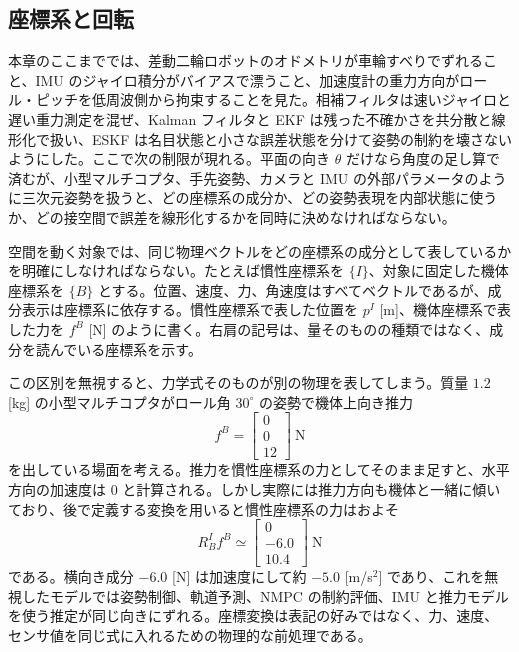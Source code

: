 \subsection{座標系と回転}

本章のここまででは、差動二輪ロボットのオドメトリが車輪すべりでずれること、IMU のジャイロ積分がバイアスで漂うこと、加速度計の重力方向がロール・ピッチを低周波側から拘束することを見た。相補フィルタは速いジャイロと遅い重力測定を混ぜ、Kalman フィルタと EKF は残った不確かさを共分散と線形化で扱い、ESKF は名目状態と小さな誤差状態を分けて姿勢の制約を壊さないようにした。ここで次の制限が現れる。平面の向き $\theta$ だけなら角度の足し算で済むが、小型マルチコプタ、手先姿勢、カメラと IMU の外部パラメータのように三次元姿勢を扱うと、どの座標系の成分か、どの姿勢表現を内部状態に使うか、どの接空間で誤差を線形化するかを同時に決めなければならない。

空間を動く対象では、同じ物理ベクトルをどの座標系の成分として表しているかを明確にしなければならない。たとえば慣性座標系を $\{I\}$、対象に固定した機体座標系を $\{B\}$ とする。位置、速度、力、角速度はすべてベクトルであるが、成分表示は座標系に依存する。慣性座標系で表した位置を $p^I$ [m]、機体座標系で表した力を $f^B$ [N] のように書く。右肩の記号は、量そのものの種類ではなく、成分を読んでいる座標系を示す。

この区別を無視すると、力学式そのものが別の物理を表してしまう。質量 $1.2$ [kg] の小型マルチコプタがロール角 $30^\circ$ の姿勢で機体上向き推力
\begin{equation}
  f^B=
  \begin{bmatrix}
    0\\0\\12
  \end{bmatrix}\ \mathrm{N}
\end{equation}
を出している場面を考える。推力を慣性座標系の力としてそのまま足すと、水平方向の加速度は 0 と計算される。しかし実際には推力方向も機体と一緒に傾いており、後で定義する変換を用いると慣性座標系の力はおよそ
\begin{equation}
  R^I_B f^B\simeq
  \begin{bmatrix}
    0\\-6.0\\10.4
  \end{bmatrix}\ \mathrm{N}
\end{equation}
である。横向き成分 $-6.0$ [N] は加速度にして約 $-5.0$ [m/s$^2$] であり、これを無視したモデルでは姿勢制御、軌道予測、NMPC の制約評価、IMU と推力モデルを使う推定が同じ向きにずれる。座標変換は表記の好みではなく、力、速度、センサ値を同じ式に入れるための物理的な前処理である。

